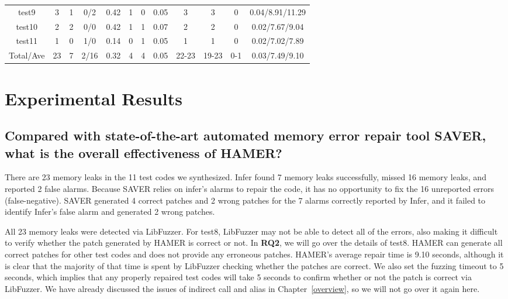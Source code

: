 \documentclass[a4paper,11pt,oneside,openany]{book}
\begin{document}
\begin{table}[h]
{{\begin{tabular}{cc|ccc|ccc|cccc}
    test9         & 3  & 1  & 0/2     & 0.42  & 1  & 0  & 0.05      & 3   & 3    & 0  & 0.04/8.91/11.29 \\
    test10       & 2  & 2  & 0/0     & 0.42  & 1  & 1  &  0.07      &  2  & 2  & 0 & 0.02/7.67/9.04 \\
    test11       & 1  & 0  & 1/0     & 0.14  & 0  & 1  &  0.05      &  1  & 1  & 0 & 0.02/7.02/7.89 \\
    \hline
   Total/Ave & 23  & 7  & 2/16  & 0.32  & 4  & 4  &  0.05      &  22-23  & 19-23  & 0-1 & 0.03/7.49/9.10 \\
    \hline
  \end{tabular}
}}
\end{table}

\section{Experimental Results}

\subsection[Research Question 1]{Compared with state-of-the-art automated memory error repair tool SAVER, what is the overall effectiveness of HAMER?}

There are 23 memory leaks in the 11 test codes we synthesized. Infer found 7 memory leaks successfully, missed 16 memory leaks, and reported 2 false alarms. Because SAVER relies on infer's alarms to repair the code, it has no opportunity to fix the 16 unreported errors (false-negative). SAVER generated 4 correct patches and 2 wrong patches for the 7 alarms correctly reported by Infer, and it failed to identify Infer's false alarm and generated 2 wrong patches.

All 23 memory leaks were detected via LibFuzzer. For test8, LibFuzzer may not be able to detect all of the errors, also making it difficult to verify whether the patch generated by HAMER is correct or not. In \textbf{RQ2}, we will go over the details of test8. HAMER can generate all correct patches for other test codes and does not provide any erroneous patches. HAMER's average repair time is 9.10 seconds, although it is clear that the majority of that time is spent by LibFuzzer checking whether the patches are correct. We also set the fuzzing timeout to 5 seconds, which implies that any properly repaired test codes will take 5 seconds to confirm whether or not the patch is correct via LibFuzzer. We have already discussed the issues of indirect call and alias in Chapter~\ref{overview}, so we will not go over it again here.
\end{document}
